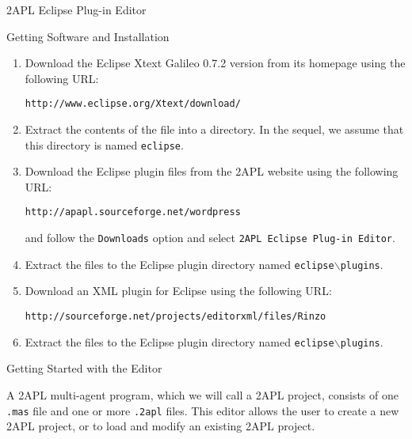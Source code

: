 \begin{chapter}{2APL Eclipse Plug-in Editor}
\begin{section}{Getting Software and Installation}
\begin{enumerate}
    \item Download the Eclipse Xtext Galileo 0.7.2 version from its homepage using the following URL:
    \begin{center}
        {\tt http://www.eclipse.org/Xtext/download/}
    \end{center}

    \item Extract the contents of the file into a directory. In the sequel, we assume that this directory is named {\tt eclipse}.

    \item Download the Eclipse plug\-in files from the 2APL website using the following URL:
    \begin{center}
    {\tt http://apapl.sourceforge.net/wordpress}
    \end{center}
    and follow the {\tt Downloads} option and select {\tt 2APL Eclipse Plug-in Editor}.

    \item Extract the files to the Eclipse plug\-in directory named {\tt eclipse$\backslash$plugins}.

    \item Download an XML plug\-in for Eclipse using the following URL:
    \begin{center}
    {\tt http://sourceforge.net/projects/editorxml/files/Rinzo}
    \end{center}

    \item Extract the files to the Eclipse plug\-in directory named
    {\tt eclipse$\backslash$plugins}.
\end{enumerate}
\end{section}


\begin{section}{Getting Started with the Editor}

A 2APL multi-agent program, which we will call a 2APL project,
consists of one \texttt{.mas} file and one or more \texttt{.2apl}
files. This editor allows the user to create a new 2APL project, or
to load and modify an existing 2APL project.


\end{section}
\end{chapter}
